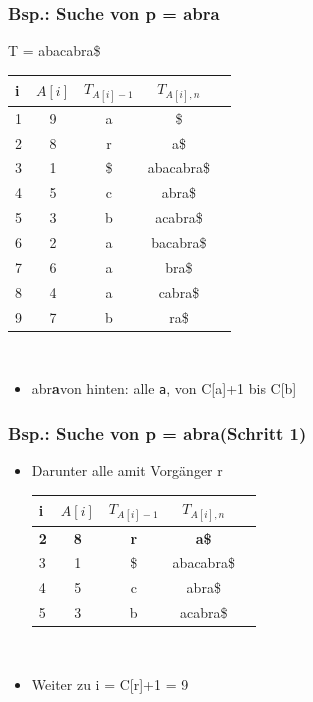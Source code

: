 \documentclass{beamer}
\begin{document}
\begin{frame}
\frametitle{Bsp.: Suche von p = \glqq abra\grqq }
T = \glqq abacabra\$\grqq\\[5mm]
\begin{tabular}{l<{\ttfamily}|c<{\ttfamily} c<{\ttfamily}c<{\ttfamily} l<{\ttfamily}}
\textbf{i} & $A[i]$ & $T_{A[i]-1}$ & $T_{A[i],n}$\\\hline
1 & 9 & a & \$ \\
2 & 8 & r & a\$ \\
3 & 1 & \$ & abacabra\$ \\
4 & 5 & c & abra\$ \\
5 & 3 & b & acabra\$ \\
6 & 2 & a & bacabra\$ \\
7 & 6 & a & bra\$ \\
8 & 4 & a & cabra\$ \\
9 & 7 & b & ra\$ \\
\end{tabular}\\[5mm]
\begin{itemize}
\item \glqq abr{\color{red}\textbf{a}}\grqq von hinten: alle \texttt{a}, von C[\glqq a\grqq ]+1 bis C[\glqq b\grqq ]
\end{itemize}
\end{frame}
\begin{frame}
\frametitle{Bsp.: Suche von p = \glqq abra\grqq (Schritt 1)}
\begin{itemize}
\item Darunter alle \glqq a\grqq mit Vorgänger \glqq r\grqq\\[5mm]
\begin{tabular}{l<{\ttfamily}|c<{\ttfamily} c<{\ttfamily}c<{\ttfamily} l<{\ttfamily}}
i & $A[i]$ & $T_{A[i]-1}$ & $T_{A[i],n}$\\\hline
\textbf{2} & \textbf{8} & \color{red}\textbf{r} & \textbf{a\$} \\
3 & 1 & \$ & abacabra\$ \\
4 & 5 & c & abra\$ \\
5 & 3 & b & acabra\$ \\
\end{tabular}\\[5mm]
\item Weiter zu i = C[\glqq r\grqq]+1 = 9
\end{itemize}
\end{frame}
\end{document}
